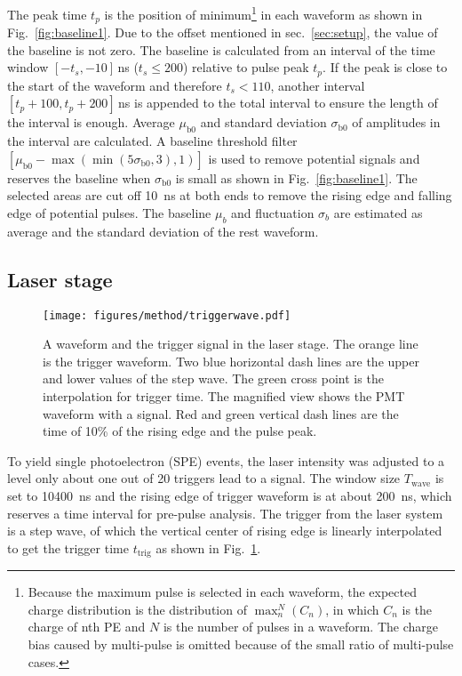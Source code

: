 The peak time $t_p$ is the position of minimum\footnote{Because the maximum pulse is selected in each waveform, the expected charge distribution is the distribution of $\max_n^N(C_n)$, in which $C_n$ is the charge of nth PE and $N$ is the number of pulses in a waveform. The charge bias caused by multi-pulse is omitted because of the small ratio of multi-pulse cases.} in each waveform as shown in Fig.~\ref{fig:baseline1}. Due to the offset mentioned in sec.~\ref{sec:setup}, the value of the baseline is not zero. The baseline is calculated from an interval of the time window $[-t_s,-10]$\,ns ($t_s\leq200$) relative to pulse peak $t_p$. If the peak is close to the start of the waveform and therefore $t_s < 110$, another interval $[t_p+100,t_p+200]$\,ns is appended to the total interval to ensure the length of the interval is enough. Average $\mu_{\mathrm{b0}}$ and standard deviation $\sigma_{\mathrm{b0}}$ of amplitudes in the interval are calculated. A baseline threshold filter $[\mu_{\mathrm{b0}}-\max(\min(5\sigma_{\mathrm{b0}},3),1)]$ is used to remove potential signals and reserves the baseline when $\sigma_{\mathrm{b0}}$ is small as shown in Fig.~\ref{fig:baseline1}. The selected areas are cut off \SI{10}{ns} at both ends to remove the rising edge and falling edge of potential pulses. The baseline $\mu_b$ and fluctuation $\sigma_b$ are estimated as average and the standard deviation of the rest waveform.

\subsection{Laser stage}
\label{sec:laserstage}

\begin{figure}[!htbp]
    \centering
    \texttt{[image: figures/method/triggerwave.pdf]}
    \caption{A waveform and the trigger signal in the laser stage. The orange line is the trigger waveform. Two blue horizontal dash lines are the upper and lower values of the step wave. The green cross point is the interpolation for trigger time. The magnified view shows the PMT waveform with a signal. Red and green vertical dash lines are the time of 10\% of the rising edge and the pulse peak.}
    \label{fig:triggertime}
\end{figure}

To yield single photoelectron (SPE) events, the laser intensity was adjusted to a level only about one out of 20 triggers lead to a signal. The window size $T_{\mathrm{wave}}$ is set to \SI{10400}{ns} and the rising edge of trigger waveform is at about \SI{200}{ns}, which reserves a time interval for pre-pulse analysis. The trigger from the laser system is a step wave, of which the vertical center of rising edge is linearly interpolated to get the trigger time $t_{\mathrm{trig}}$ as shown in Fig.~\ref{fig:triggertime}.

